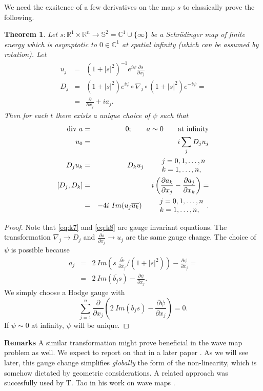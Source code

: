 \documentclass[draft,11pt,leqno]{amsart}
\newtheorem{theorem}{Theorem}
\newcommand{\qq}{\quad\quad}
\newcommand{\rn}{{\mathbb R}^n}
\newcommand{\rone}{\mathbb R^1}
\newcommand{\cone}{\mathbb C^1}
\newcommand{\stwo}{\mathbb S^2}
\newcommand{\suml}{\sum\limits}
\newcommand{\f}{\displaystyle\frac}
\newcommand{\p}{\partial}
\newcommand{\pp}[2]{\f{\p #1}{\p #2}}
\begin{document}
We need the exsitence of a few derivatives on the map $s$ 
to classically prove the following.
\begin{theorem}
\label{theo:ak1}
Let $s:\rone\times\rn\to \stwo=\cone\cup\{\infty\}$ be a Schr\"odinger map
 of finite energy which is asymptotic to $0\in\cone$ at spatial infinity
(which can be assumed by rotation). Let 
\begin{eqnarray*}
u_j &=& (1+|s|^2)^{-1}e^{i\psi}\pp{s}{x_j}\\
D_j &=& (1+|s|^2)e^{i\psi}\circ\nabla_j\circ(1+|s|^2)e^{-i\psi} = \\
&=&\pp{}{x_j}+ia_j.
\end{eqnarray*}
Then for each $t$ there exists a unique choice of $\psi$ such that 
\begin{eqnarray}
\label{eq:k5}
\textup{div}\ a &=& 0;\qq a\sim 0 \qq \textup{at infinity}\\
\label{eq:k6}
u_0 &=& i\suml_j D_ju_j \\
\label{eq:k7}
D_j u_k &=& D_ku_j \qq\begin{array}{l}
j=0,1,\ldots,n\\
k=1,\ldots,n,
\end{array}\\
\label{eq:k8}
[D_j,D_k] &=& i\left(\pp{a_k}{x_j}-\pp{a_j}{x_k}\right)= \\
\nonumber
&=& -4i\ Im(u_j\overline{u_k})\qq\begin{array}{l}
j=0,1,\ldots,n\\
k=1,\ldots,n,
\end{array}.
\end{eqnarray}
\end{theorem}
\begin{proof}
Note that \eqref{eq:k7} and  \eqref{eq:k8} are gauge invariant equations.
 The transformation $\nabla_j\to D_j$ and $\pp{s}{x_j}\to u_j$ are the 
same gauge change. The choice of $\psi$ is possible because 
\begin{eqnarray*}
a_j &=& 2\ Im\left(s\ \overline{\pp{s}{x_j}}/(1+|s|^2)\right)-\pp{\psi}{x_j}= \\
&=& 2\ Im (\overline{b_j}s)-\pp{\psi}{x_j}.
\end{eqnarray*}
We simply choose a Hodge gauge with 
$$
\suml_{j=1}^n \pp{}{x_j}\left(2\ Im (\overline{b_j}s)-\pp{\psi}{x_j}\right)=0.
$$
If $\psi \sim 0$ at infinity, $\psi$ will be unique.
\end{proof}
{\bf Remarks} A similar transformation might prove beneficial in 
the wave map problem as well.  We expect to report on that in a later paper 
\cite{Nahmod}. As we will see later, this gauge change simplifies 
{\it globally} the form of the non-linearity, which is somehow  dictated by 
geometric considerations. A related approach was succesfully
used by T. Tao in his work on wave maps \cite{Tao1}. 
\end{document}
